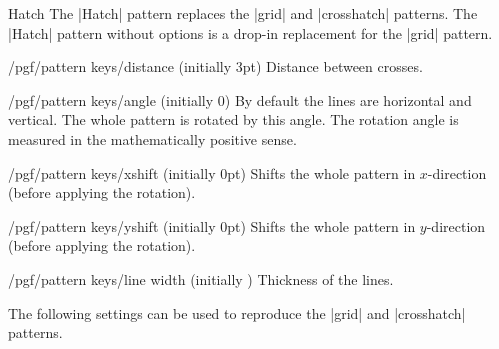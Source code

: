 \begin{pattern}{Hatch}
    The |Hatch| pattern replaces the |grid| and |crosshatch| patterns.
    The |Hatch| pattern without options is a drop-in replacement for the
    |grid| pattern.
    \begin{key}{/pgf/pattern keys/distance (initially 3pt)}
        Distance between crosses.
    \end{key}
    \begin{key}{/pgf/pattern keys/angle (initially 0)}
        By default the lines are horizontal and vertical. The whole pattern is
        rotated by this angle. The rotation angle is measured in the
        mathematically positive sense.
    \end{key}
    \begin{key}{/pgf/pattern keys/xshift (initially 0pt)}
        Shifts the whole pattern in $x$-direction (before applying the
        rotation).
    \end{key}
    \begin{key}{/pgf/pattern keys/yshift (initially 0pt)}
        Shifts the whole pattern in $y$-direction (before applying the
        rotation).
    \end{key}
    \begin{key}{/pgf/pattern keys/line width (initially \string\the\string\pgflinewidth)}
        Thickness of the lines.
    \end{key}
    The following settings can be used to reproduce the |grid| and
    |crosshatch| patterns.
\begin{codeexample}[preamble={\usetikzlibrary{patterns,patterns.meta}}]
\end{codeexample}
\end{pattern}

